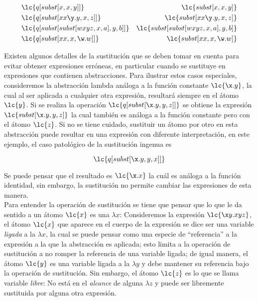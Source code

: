 \begin{align*}
  &\lc{q[subst[x, x, y]]} & \lc{subst[x, x, y]} \\
  &\lc{q[subst[x x \y.y, x, z]]} & \lc{subst[x x \y.y, x, z]} \\
  &\lc{q[subst[subst[w x y z,x,a],y,b]]} & \lc{subst[subst[w x y z,x,a],y,b]} \\
  &\lc{q[subst[x x, x, \w.w]]} & \lc{subst[x x, x, \w.w]} \\
\end{align*}

Existen algunos detalles de la sustitución que se deben tomar en cuenta para
evitar obtener expresiones erróneas, en particular cuando se sustituye en
expresiones que contienen abstracciones. Para ilustrar estos casos especiales,
consideremos la abstracción lambda análoga a la función constante \(\lc{\x.y}\),
la cual al ser aplicada a cualquier otra expresión, resultará siempre en el
átomo \(\lc{y}\). Si se realiza la operación \(\lc{q[subst[\x.y,y,z]]}\) se
obtiene la expresión \(\lc{subst[\x.y,y,z]}\) la cual también es análoga a la
función constante pero con el átomo \(\lc{z}\). Si no se tiene cuidado,
sustituir un átomo por otro en esta abstracción puede resultar en una expresión
con diferente interpretación, en este ejemplo, el caso patológico de la
sustitución ingenua es

\[\lc{q[subst[\x.y,y,x]]}\]

Se puede pensar que el resultado es \(\lc{\x.x}\) la cuál es análoga a la
función identidad, sin embargo, la sustitución no permite cambiar las
expresiones de esta manera. \\

Para entender la operación de sustitución se tiene que pensar que lo que le da
sentido a un átomo \(\lc{x}\) es una \(\lambda x\): Consideremos la expresión
\(\lc{\x y.x y z}\), el átomo \(\lc{x}\) que aparece en el cuerpo de la
expresión se dice ser una variable \emph{ligada} a la \(\lambda x\), la cual se
puede pensar como una especie de ``referencia'' a la expresión a la que la
abstracción es aplicada; esto limita a la operación de sustitución a no romper
la referencia de una variable ligada; de igual manera, el átomo \(\lc{y}\) es
una variable ligada a la \(\lambda y\) y debe mantener su referencia bajo la
operación de sustitución. Sin embargo, el átomo \(\lc{z}\) es lo que se llama
variable \emph{libre}: No está en el \emph{alcance} de alguna
\(\lambda z\) y puede ser libremente sustituida por alguna otra expresión. \\

